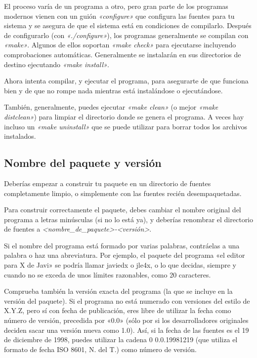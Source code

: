 \documentclass[letterpaper,12pt,spanish]{manual}
\begin{document}
El proceso varía de un programa a otro, pero gran parte de los programas modernos vienen con un guión \emph{«configure»} que configura las fuentes para tu sistema y se asegura de que el sistema está en condiciones de compilarlo. Después de configurarlo (con \emph{«./configure»}), los programas generalmente se compilan con \emph{«make»}. Algunos de ellos soportan \emph{«make check»} para ejecutarse incluyendo comprobaciones automáticas. Generalmente se instalarán en sus directorios de destino ejecutando \emph{«make install»}.

Ahora intenta compilar, y ejecutar el programa, para asegurarte de que funciona bien y de que no rompe nada mientras está instalándose o ejecutándose.

También, generalmente, puedes ejecutar \emph{«make clean»} (o mejor \emph{«make distclean»}) para limpiar el directorio donde se genera el programa. A veces hay incluso un \emph{«make uninstall»} que se puede utilizar para borrar todos los archivos instalados.


\subsection{Nombre del paquete y versión}

Deberías empezar a construir tu paquete en un directorio de fuentes completamente limpio, o simplemente con las fuentes recién desempaquetadas.

Para construir correctamente el paquete, debes cambiar el nombre original del programa a letras minúsculas (si no lo está ya), y deberías renombrar el directorio de fuentes a \emph{\textless{}nombre\_de\_paquete\textgreater{}-\textless{}versión\textgreater{}}.

Si el nombre del programa está formado por varias palabras, contráelas a una palabra o haz una abreviatura. Por ejemplo, el paquete del programa «el editor para X de Javi» se podría llamar javiedx o jle4x, o lo que decidas, siempre y cuando no se exceda de unos límites razonables, como 20 caracteres.

Comprueba también la versión exacta del programa (la que se incluye en la versión del paquete). Si el programa no está numerado con versiones del estilo de X.Y.Z, pero sí con fecha de publicación, eres libre de utilizar la fecha como número de versión, precedida por «0.0» (sólo por si los desarrolladores originales deciden sacar una versión nueva como 1.0). Así, si la fecha de las fuentes es el 19 de diciembre de 1998, puedes utilizar la cadena 0 0.0.19981219 (que utiliza el formato de fecha ISO 8601, N. del T.) como número de versión.
\end{document}
